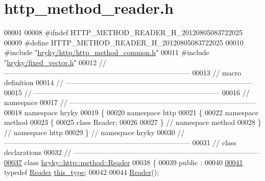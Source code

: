 \hypertarget{http__method__reader_8h_source}{\section{http\-\_\-method\-\_\-reader.\-h}
}

\begin{DoxyCode}
00001 
00008 \textcolor{preprocessor}{#ifndef HTTP\_METHOD\_READER\_H\_20120805083722025}
00009 \textcolor{preprocessor}{}\textcolor{preprocessor}{#define HTTP\_METHOD\_READER\_H\_20120805083722025}
00010 \textcolor{preprocessor}{}\textcolor{preprocessor}{#include "\hyperlink{http__method__common_8h}{hryky/http/http_method_common.h}"}
00011 \textcolor{preprocessor}{#include "\hyperlink{fixed__vector_8h}{hryky/fixed_vector.h}"}
00012 \textcolor{comment}{//
      ------------------------------------------------------------------------------}
00013 \textcolor{comment}{// macro definition}
00014 \textcolor{comment}{//
      ------------------------------------------------------------------------------}
00015 \textcolor{comment}{//
      ------------------------------------------------------------------------------}
00016 \textcolor{comment}{// namespace}
00017 \textcolor{comment}{//
      ------------------------------------------------------------------------------}
00018 \textcolor{keyword}{namespace }hryky
00019 \{
00020 \textcolor{keyword}{namespace }http
00021 \{
00022 \textcolor{keyword}{namespace }method
00023 \{
00025     \textcolor{keyword}{class }Reader;
00026 
00027 \} \textcolor{comment}{// namespace method}
00028 \} \textcolor{comment}{// namespace http}
00029 \} \textcolor{comment}{// namespace hryky}
00030 \textcolor{comment}{//
      ------------------------------------------------------------------------------}
00031 \textcolor{comment}{// class declarations}
00032 \textcolor{comment}{//
      ------------------------------------------------------------------------------}
\hypertarget{http__method__reader_8h_source_l00037}{}\hyperlink{classhryky_1_1http_1_1method_1_1_reader}{00037} \textcolor{comment}{}\textcolor{keyword}{class }\hyperlink{classhryky_1_1http_1_1method_1_1_reader}{hryky::http::method::Reader}
00038 \{
00039 \textcolor{keyword}{public} :
00040 
\hypertarget{http__method__reader_8h_source_l00041}{}\hyperlink{classhryky_1_1http_1_1method_1_1_reader_acbfb161bac6c8d7c1eacb754150061a1}{00041}     \textcolor{keyword}{typedef} \hyperlink{classhryky_1_1http_1_1method_1_1_reader}{Reader} \hyperlink{classhryky_1_1http_1_1method_1_1_reader_acbfb161bac6c8d7c1eacb754150061a1}{this_type};
00042 
00044     \hyperlink{classhryky_1_1http_1_1method_1_1_reader_a3701f1eba6ed113ec7a5450946faf22e}{Reader}();

\end{DoxyCode}
